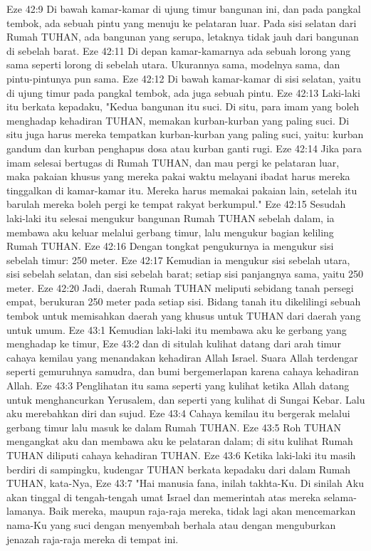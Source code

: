 Eze 42:9  Di bawah kamar-kamar di ujung timur bangunan ini, dan pada pangkal tembok, ada sebuah pintu yang menuju ke pelataran luar. Pada sisi selatan dari Rumah TUHAN, ada bangunan yang serupa, letaknya tidak jauh dari bangunan di sebelah barat.
Eze 42:11  Di depan kamar-kamarnya ada sebuah lorong yang sama seperti lorong di sebelah utara. Ukurannya sama, modelnya sama, dan pintu-pintunya pun sama.
Eze 42:12  Di bawah kamar-kamar di sisi selatan, yaitu di ujung timur pada pangkal tembok, ada juga sebuah pintu.
Eze 42:13  Laki-laki itu berkata kepadaku, "Kedua bangunan itu suci. Di situ, para imam yang boleh menghadap kehadiran TUHAN, memakan kurban-kurban yang paling suci. Di situ juga harus mereka tempatkan kurban-kurban yang paling suci, yaitu: kurban gandum dan kurban penghapus dosa atau kurban ganti rugi.
Eze 42:14  Jika para imam selesai bertugas di Rumah TUHAN, dan mau pergi ke pelataran luar, maka pakaian khusus yang mereka pakai waktu melayani ibadat harus mereka tinggalkan di kamar-kamar itu. Mereka harus memakai pakaian lain, setelah itu barulah mereka boleh pergi ke tempat rakyat berkumpul."
Eze 42:15  Sesudah laki-laki itu selesai mengukur bangunan Rumah TUHAN sebelah dalam, ia membawa aku keluar melalui gerbang timur, lalu mengukur bagian keliling Rumah TUHAN.
Eze 42:16  Dengan tongkat pengukurnya ia mengukur sisi sebelah timur: 250 meter.
Eze 42:17  Kemudian ia mengukur sisi sebelah utara, sisi sebelah selatan, dan sisi sebelah barat; setiap sisi panjangnya sama, yaitu 250 meter.
Eze 42:20  Jadi, daerah Rumah TUHAN meliputi sebidang tanah persegi empat, berukuran 250 meter pada setiap sisi. Bidang tanah itu dikelilingi sebuah tembok untuk memisahkan daerah yang khusus untuk TUHAN dari daerah yang untuk umum.
Eze 43:1  Kemudian laki-laki itu membawa aku ke gerbang yang menghadap ke timur,
Eze 43:2  dan di situlah kulihat datang dari arah timur cahaya kemilau yang menandakan kehadiran Allah Israel. Suara Allah terdengar seperti gemuruhnya samudra, dan bumi bergemerlapan karena cahaya kehadiran Allah.
Eze 43:3  Penglihatan itu sama seperti yang kulihat ketika Allah datang untuk menghancurkan Yerusalem, dan seperti yang kulihat di Sungai Kebar. Lalu aku merebahkan diri dan sujud.
Eze 43:4  Cahaya kemilau itu bergerak melalui gerbang timur lalu masuk ke dalam Rumah TUHAN.
Eze 43:5  Roh TUHAN mengangkat aku dan membawa aku ke pelataran dalam; di situ kulihat Rumah TUHAN diliputi cahaya kehadiran TUHAN.
Eze 43:6  Ketika laki-laki itu masih berdiri di sampingku, kudengar TUHAN berkata kepadaku dari dalam Rumah TUHAN, kata-Nya,
Eze 43:7  "Hai manusia fana, inilah takhta-Ku. Di sinilah Aku akan tinggal di tengah-tengah umat Israel dan memerintah atas mereka selama-lamanya. Baik mereka, maupun raja-raja mereka, tidak lagi akan mencemarkan nama-Ku yang suci dengan menyembah berhala atau dengan menguburkan jenazah raja-raja mereka di tempat ini.

